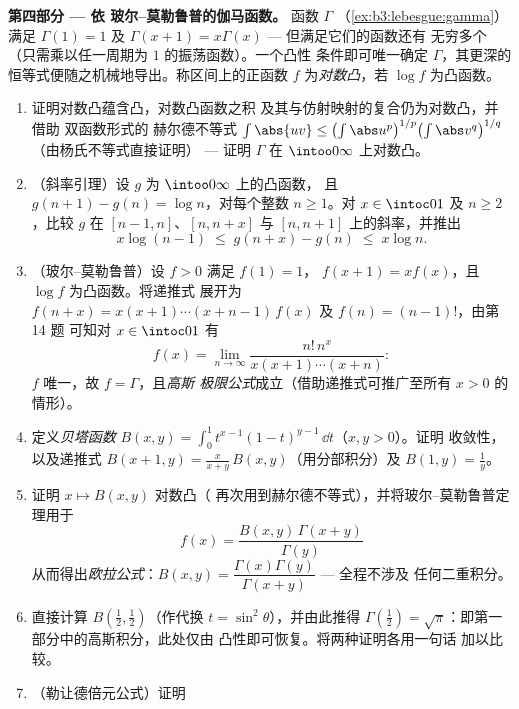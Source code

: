 \begin{problem}
\medskip
\noindent\textbf{第四部分 --- 依
玻尔--莫勒鲁普的伽马函数。} 函数 $\Gamma$
        （\cref{ex:b3:lebesgue:gamma}）满足 $\Gamma(1) = 1$ 及
        $\Gamma(x+1) = x\Gamma(x)$ --- 但满足它们的函数还有
        无穷多个（只需乘以任一周期为 $1$ 的振荡函数）。一个凸性
        条件即可唯一确定 $\Gamma$，其更深的
        恒等式便随之机械地导出。称区间上的正函数 $f$
        为\emph{对数凸}，若 $\log f$ 为凸函数。
\begin{enumerate}[resume]
  \item 证明对数凸蕴含凸，对数凸函数之积
        及其与仿射映射的复合仍为对数凸，并借助
        双函数形式的
        赫尔德不等式 $\int\abs{uv} \leq
        \bigl(\int\abs u^p\bigr)^{1/p}\bigl(\int\abs
        v^q\bigr)^{1/q}$（由杨氏不等式直接证明） ---
        证明 $\Gamma$ 在
        $\intoo0\infty$ 上对数凸。
  \item （斜率引理）设 $g$ 为 $\intoo0\infty$ 上的凸函数，
        且 $g(n+1) - g(n) = \log n$，对每个整数 $n
        \geq 1$。对 $x \in \intoc01$ 及 $n \geq 2$，比较
        $g$ 在 $[n-1, n]$、$[n, n+x]$ 与
        $[n, n+1]$ 上的斜率，并推出
        \[
        x\log(n-1) \;\leq\; g(n + x) - g(n) \;\leq\; x\log n .
        \]
  \item （玻尔--莫勒鲁普）设 $f > 0$ 满足 $f(1) = 1$，
        $f(x+1) = xf(x)$，且 $\log f$ 为凸函数。将递推式
        展开为 $f(n + x) = x(x+1)\cdots(x + n -
        1)\,f(x)$ 及 $f(n) = (n-1)!$，由第 14 题
        可知对 $x \in \intoc01$ 有
        \[
        f(x) = \lim_{n\to\infty}
        \frac{n!\,n^x}{x(x+1)\cdots(x+n)} :
        \]
        $f$ 唯一，故 $f = \Gamma$，且\emph{高斯
        极限公式}成立（借助递推式可推广至所有 $x > 0$
        的情形）。
  \item 定义\emph{贝塔函数} $B(x, y) =
        \int_0^1t^{x-1}(1-t)^{y-1}\,\dd t$（$x, y > 0$）。证明
        收敛性，以及递推式 $B(x+1, y) =
        \frac{x}{x+y}\,B(x, y)$（用分部积分）及
        $B(1, y) = \frac1y$。
  \item 证明 $x \mapsto B(x, y)$ 对数凸（
        再次用到赫尔德不等式），并将玻尔--莫勒鲁普定理用于
        \[
        f(x) = \frac{B(x, y)\,\Gamma(x + y)}{\Gamma(y)}
        \]
        从而得出\emph{欧拉公式}：$B(x, y) =
        \dfrac{\Gamma(x)\Gamma(y)}{\Gamma(x+y)}$ --- 全程不涉及
        任何二重积分。
  \item 直接计算 $B(\frac12, \frac12)$（作代换 $t
        = \sin^2\theta$），并由此推得 $\Gamma(\frac12) =
        \sqrt\pi$：即第一部分中的高斯积分，此处仅由
        凸性即可恢复。将两种证明各用一句话
        加以比较。
  \item （勒让德倍元公式）证明

\end{enumerate}
\end{problem}
